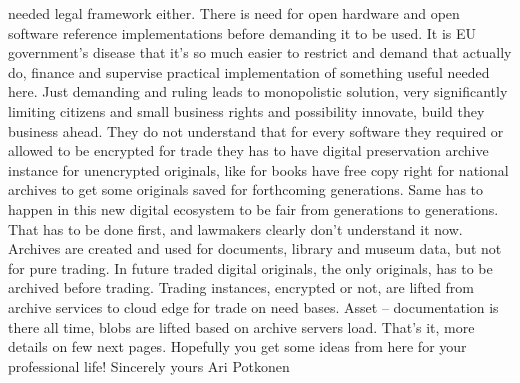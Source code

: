 needed legal framework either. There is need for open hardware and open
software reference implementations before demanding it to be used. It is EU
government's disease that it's so much easier to restrict and demand that
actually do, finance and supervise practical implementation of something useful
needed here. Just demanding and ruling leads to monopolistic solution, very
significantly limiting citizens and small business rights and possibility
innovate, build they business ahead. They do not understand that for every
software they required or allowed to be encrypted for trade they has to have
digital preservation archive instance for unencrypted originals, like for books
have free copy right for national archives to get some originals saved for
forthcoming generations. Same has to happen in this new digital ecosystem to be
fair from generations to generations. That has to be done first, and lawmakers
clearly don't understand it now. Archives are created and used for documents,
library and museum data, but not for pure trading. In future traded digital
originals, the only originals, has to be archived before trading. Trading
instances, encrypted or not, are lifted from archive services to cloud edge for
trade on need bases. Asset -- documentation is there all time, blobs are lifted
based on archive servers load. That's it, more details on few next pages.
Hopefully you get some ideas from here for your professional life!
Sincerely yours Ari Potkonen
